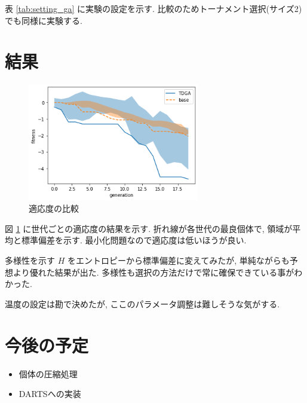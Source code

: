 \documentclass[twocolumn]{jarticle}     %
\begin{document}
表 \ref{tab:setting_ga} に実験の設定を示す.
比較のためトーナメント選択(サイズ2)でも同様に実験する.

\section{結果}


\begin{figure}[tb]
  \begin{center}
    \includegraphics[clip,width=75mm]{fit.png}
    \caption{適応度の比較}
    \label{fig:fit}
  \end{center}
\end{figure}


図 \ref{fig:fit} に世代ごとの適応度の結果を示す.
折れ線が各世代の最良個体で, 領域が平均と標準偏差を示す.
最小化問題なので適応度は低いほうが良い.

多様性を示す $H$ をエントロピーから標準偏差に変えてみたが,
単純ながらも予想より優れた結果が出た.
多様性も選択の方法だけで常に確保できている事がわかった.

温度の設定は勘で決めたが, ここのパラメータ調整は難しそうな気がする.

\section{今後の予定}

\begin{itemize}
  \item 個体の圧縮処理
  \item DARTSへの実装
\end{itemize}



\end{document}
